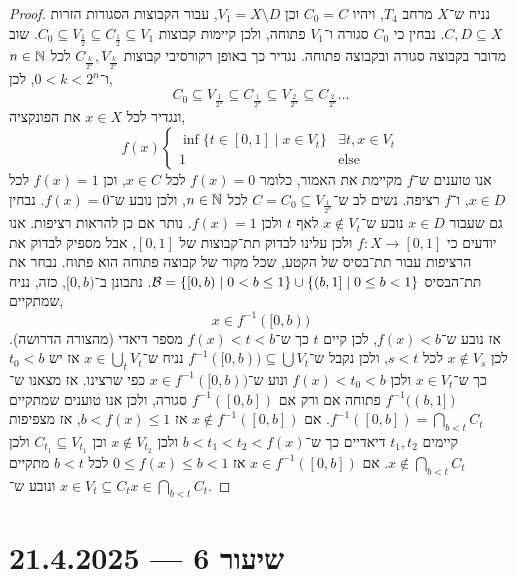 \begin{proof}
	נניח ש־$X$ מרחב $T_4$, ויהיו $C_0 = C$ וכן $V_1 = X \setminus D$, עבור הקבוצות הסגורות הזרות $C, D \subseteq X$.
	נבחין כי $C_0$ סגורה ו־$V_1$ פתוחה, ולכן קיימות קבוצות $C_0 \subseteq V_{\frac{1}{2}} \subseteq C_{\frac{1}{2}} \subseteq V_1$.
	שוב מדובר בקבוצה סגורה ובקבוצה פתוחה.
	נגדיר כך באופן רקורסיבי קבוצות $C_{\frac{k}{2^n}}, V_{\frac{k}{2^n}}$ לכל $n \in \mathbb{N}$ ו־$0 < k < 2^n$, לכן,
	\[
		C_0
		\subseteq V_{\frac{1}{2^n}}
		\subseteq C_{\frac{1}{2^n}}
		\subseteq V_{\frac{2}{2^n}}
		\subseteq C_{\frac{2}{2^n}}
		\ldots 
	\]
	ונגדיר לכל $x \in X$ את הפונקציה,
	\[
		f(x)
		\begin{cases}
			\inf\{ t \in [0, 1] \mid x \in V_t \} & \exists t, x \in V_t \\
			1 & \text{else}
		\end{cases}
	\]
	אנו טוענים ש־$f$ מקיימת את האמור, כלומר $f(x) = 0$ לכל $x \in C$, וכן $f(x) = 1$ לכל $x \in D$, ו־$f$ רציפה.
	נשים לב ש־$C = C_0 \subseteq V_{\frac{1}{2^n}}$ לכל $n \in \mathbb{N}$, ולכן נובע ש־$f(x) = 0$.
	נבחין גם שעבור $x \in D$ נובע ש־$x \notin V_t$ לאף $t$ ולכן $f(x) = 1$.
	נותר אם כן להראות רציפות.
	אנו יודעים כי $f : X \to [0, 1]$ ולכן עלינו לבדוק תת־קבוצות של $[0, 1]$, אבל מספיק לבדוק את הרציפות עבור תת־בסיס של הקטע, שכל מקור של קבוצה פתוחה הוא פתוח.
	נבחר את תת־הבסיס $\mathcal{B} = \{ [0, b) \mid 0 < b \le 1 \} \cup \{ (b, 1] \mid 0 \le b < 1\}$.
	נתבונן ב־$[0, b)$, כזה, נניח שמתקיים,
	\[
		x \in f^{-1}([0, b))
	\]
	אז נובע ש־$f(x) < b$, לכן קיים $t$ כך ש־$f(x) < t < b$ מספר דיאדי (מהצורה הדרושה).
	לכן $x \notin V_s$ לכל $s < t$, ולכן נקבל ש־$f^{-1}([0, b)) \subseteq \bigcup V_t$
	נניח ש־$x \in \bigcup_t V_t$ אז יש $t_0 < b$ כך ש־$x \in V_t$ ולכן $f(x) < t_0 < b$ ונוע ש־$x \in f^{-1}([0, b))$ כפי שרצינו.
	אז מצאנו ש־$f^{-1}((b, 1])$ פתוחה אם ורק אם $f^{-1}([0, b])$ סגורה, ולכן אנו טוענים שמתקיים $f^{-1}([0, b]) = \bigcap_{b < t} C_t$.
	אם $x \notin f^{-1}([0, b])$ אז $b < f(x) \le 1$, אז מצפיפות קיימים $t_1, t_2$ דיאדיים כך ש־$b < t_1 < t_2 < f(x)$ ולכן $x \notin V_{t_2}$ וכן $C_{t_1} \subseteq V_{t_1}$ ולכן $x \notin \bigcap_{b < t} C_t$.
	אם $x \in f^{-1}([0, b])$ אז $0 \le f(x) \le b < 1$ לכל $b < t$ מתקיים $x \in V_t \subseteq C_t$ ונובע ש־$x \in \bigcap_{b < t} C_t$.
\end{proof}

\section{שיעור 6 --- 21.4.2025}
